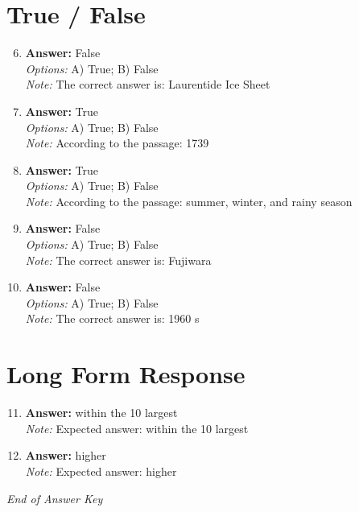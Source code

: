 \documentclass[12pt]{article}
\begin{document}
\section*{True / False}
\begin{enumerate}[label=\arabic*.]
\setcounter{enumi}{5}
\item \textbf{Answer:} False
\\ \textit{Options:} A) True; B) False
\\ \textit{Note:} The correct answer is: Laurentide Ice Sheet
\item \textbf{Answer:} True
\\ \textit{Options:} A) True; B) False
\\ \textit{Note:} According to the passage: 1739
\item \textbf{Answer:} True
\\ \textit{Options:} A) True; B) False
\\ \textit{Note:} According to the passage: summer, winter, and rainy season
\item \textbf{Answer:} False
\\ \textit{Options:} A) True; B) False
\\ \textit{Note:} The correct answer is: Fujiwara
\item \textbf{Answer:} False
\\ \textit{Options:} A) True; B) False
\\ \textit{Note:} The correct answer is: 1960 s
\end{enumerate}

\section*{Long Form Response}
\begin{enumerate}[label=\arabic*.]
\setcounter{enumi}{10}
\item \textbf{Answer:} within the 10 largest
\\ \textit{Note:} Expected answer: within the 10 largest
\item \textbf{Answer:} higher
\\ \textit{Note:} Expected answer: higher
\end{enumerate}

\vfill
\noindent\textit{End of Answer Key}
\end{document}
